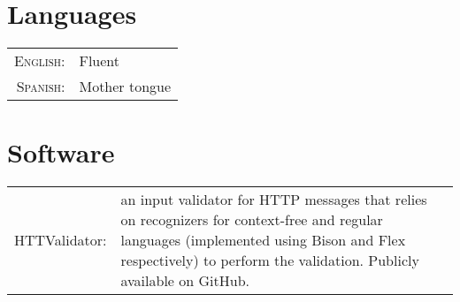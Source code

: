 \documentclass[a4paper,10pt]{article} %
\begin{document}
\section{Languages}

\begin{tabular}{rl}
\textsc{English:} & Fluent\\

\textsc{Spanish:} & Mother tongue\\

\end{tabular}


\section{Software}

\begin{tabular}{rp{11cm}}
HTTValidator: & an input validator for HTTP messages that relies on recognizers for context-free and regular languages (implemented using Bison and Flex respectively) to perform the validation. Publicly available on GitHub. \\
\end{tabular}


\end{document}
